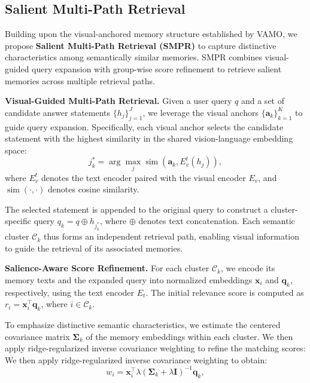 \subsection{Salient Multi-Path Retrieval}
\label{sec:smpr}

Building upon the visual-anchored memory structure established by VAMO, we propose \textbf{Salient Multi-Path Retrieval (SMPR)} to capture distinctive characteristics among semantically similar memories.
SMPR combines visual-guided query expansion with group-wise score refinement to retrieve salient memories across multiple retrieval paths.

\noindent \textbf{Visual-Guided Multi-Path Retrieval.}
Given a user query $q$ and a set of candidate answer statements $\{h_j\}_{j=1}^{J}$, we leverage the visual anchors $\{\mathbf{a}_k\}_{k=1}^{K}$ to guide query expansion.
Specifically, each visual anchor selects the candidate statement with the highest similarity in the shared vision-language embedding space:
\begin{equation}
    j_k^* = \arg\max_j
    \operatorname{sim}\left(
    \mathbf{a}_k, E_v^t(h_j)
    \right),
\end{equation}
where $E_v^t$ denotes the text encoder paired with the visual encoder $E_v$, and $\operatorname{sim}(\cdot,\cdot)$ denotes cosine similarity.

The selected statement is appended to the original query to construct a cluster-specific query $q_k=q\oplus h_{j_k^*}$, where $\oplus$ denotes text concatenation.
Each semantic cluster $\mathcal{C}_k$ thus forms an independent retrieval path, enabling visual information to guide the retrieval of its associated memories.

\noindent \textbf{Salience-Aware Score Refinement.}
For each cluster $\mathcal{C}_k$, we encode its memory texts and the expanded query into normalized embeddings $\mathbf{x}_i$ and $\mathbf{q}_k$, respectively, using the text encoder $E_t$.
The initial relevance score is computed as $r_i=\mathbf{x}_i^\top\mathbf{q}_k$, where $i\in\mathcal{C}_k$.


To emphasize distinctive semantic characteristics, we estimate the centered covariance matrix $\boldsymbol{\Sigma}_k$ of the memory embeddings within each cluster.
We then apply ridge-regularized inverse covariance weighting to refine the matching scores:
We then apply ridge-regularized inverse covariance weighting to obtain:
\begin{equation}
    w_i =
    \mathbf{x}_i^\top
    \lambda(\boldsymbol{\Sigma}_k+\lambda\mathbf{I})^{-1}
    \mathbf{q}_k,
\end{equation}

